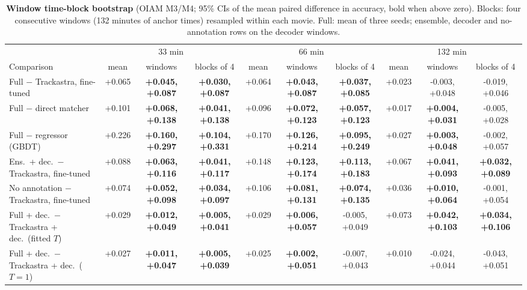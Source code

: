 \begin{table}[t]
\centering\small
\setlength{\tabcolsep}{3pt}
\begin{adjustbox}{max width=\linewidth}
\begin{tabular}{lccccccccc}
\toprule
 & \multicolumn{3}{c}{33 min} & \multicolumn{3}{c}{66 min} & \multicolumn{3}{c}{132 min} \\
\cmidrule(lr){2-4}\cmidrule(lr){5-7}\cmidrule(lr){8-10}
Comparison & mean & windows & blocks of 4 & mean & windows & blocks of 4 & mean & windows & blocks of 4 \\
\midrule
Full $-$ Trackastra, fine-tuned & +0.065 & \textbf{+0.045, +0.087} & \textbf{+0.030, +0.087} & +0.064 & \textbf{+0.043, +0.087} & \textbf{+0.037, +0.085} & +0.023 & {-0.003, +0.048} & {-0.019, +0.046} \\
Full $-$ direct matcher & +0.101 & \textbf{+0.068, +0.138} & \textbf{+0.041, +0.138} & +0.096 & \textbf{+0.072, +0.123} & \textbf{+0.057, +0.123} & +0.017 & \textbf{+0.004, +0.031} & {-0.005, +0.028} \\
Full $-$ regressor (GBDT) & +0.226 & \textbf{+0.160, +0.297} & \textbf{+0.104, +0.331} & +0.170 & \textbf{+0.126, +0.214} & \textbf{+0.095, +0.249} & +0.027 & \textbf{+0.003, +0.048} & {-0.002, +0.057} \\
Ens.\ + dec.\ $-$ Trackastra, fine-tuned & +0.088 & \textbf{+0.063, +0.116} & \textbf{+0.041, +0.117} & +0.148 & \textbf{+0.123, +0.174} & \textbf{+0.113, +0.183} & +0.067 & \textbf{+0.041, +0.093} & \textbf{+0.032, +0.089} \\
No annotation $-$ Trackastra, fine-tuned & +0.074 & \textbf{+0.052, +0.098} & \textbf{+0.034, +0.097} & +0.106 & \textbf{+0.081, +0.131} & \textbf{+0.074, +0.135} & +0.036 & \textbf{+0.010, +0.064} & {-0.001, +0.054} \\
Full + dec.\ $-$ Trackastra + dec.\ (fitted $T$) & +0.029 & \textbf{+0.012, +0.049} & \textbf{+0.005, +0.041} & +0.029 & \textbf{+0.006, +0.057} & {-0.005, +0.049} & +0.073 & \textbf{+0.042, +0.103} & \textbf{+0.034, +0.106} \\
Full + dec.\ $-$ Trackastra + dec.\ ($T{=}1$) & +0.027 & \textbf{+0.011, +0.047} & \textbf{+0.005, +0.039} & +0.025 & \textbf{+0.002, +0.051} & {-0.007, +0.043} & +0.010 & {-0.024, +0.044} & {-0.043, +0.051} \\
\bottomrule
\end{tabular}
\end{adjustbox}
\caption{\textbf{Window \vs time-block bootstrap} (OIAM M3/M4; 95\% CIs of the mean paired difference in accuracy, bold when above zero). Blocks: four consecutive windows (132 minutes of anchor times) resampled within each movie. Full: mean of three seeds; ensemble, decoder and no-annotation rows on the decoder windows.}
\label{tab:blockboot}
\end{table}
